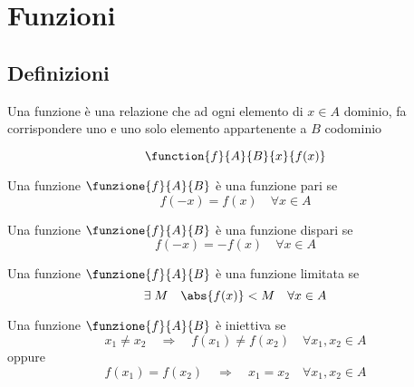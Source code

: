 \chapter{Funzioni}\label{ch:funzioni}
\section{Definizioni}\label{sec:definizione}
\begin{defn}[Funzione]\label{defn:FunzioneDefinizione}
	Una funzione è una relazione che ad ogni elemento di $x\in A$ dominio, fa corrispondere uno e uno solo elemento appartenente  a $B$ codominio
\end{defn}
\begin{equation*}
\function{f}{A}{B}{x}{f(x)}
\end{equation*}
\begin{defn}\label{defn:funzione-pari}
	Una funzione $\funzione{f}{A}{B}$ è una funzione pari se 
	\begin{equation*}
	f(-x)=f(x)\quad\forall x\in A
	\end{equation*}
\end{defn}
{\centering
	
	\par}
\begin{defn}\label{defn:funzione-dispari}
Una funzione $\funzione{f}{A}{B}$ è una funzione dispari se 
\begin{equation*}
f(-x)=-f(x)\quad\forall x\in A
\end{equation*}
\end{defn}
{\centering
	
	\par}
\begin{defn}\label{defn:funzione-limitata}
Una funzione $\funzione{f}{A}{B}$ è una funzione limitata se 
\begin{equation*}
\exists\; M\quad \abs{f(x)}<M \quad\forall x\in A
\end{equation*}
\end{defn}
{\centering
	
	\par}
\begin{defn}\label{defn:funzione-iniettiva}
	Una funzione $\funzione{f}{A}{B}$ è iniettiva se
	\begin{equation*}
	x_1\neq x_2\quad\Longrightarrow\quad f(x_1)\neq f(x_2)\quad \forall x_1,x_2\in A
	\end{equation*}
	oppure
	\begin{equation*}
	f(x_1)= f(x_2)\quad\Longrightarrow\quad  x_1= x_2\quad \forall x_1,x_2\in A
	\end{equation*}
\end{defn}
